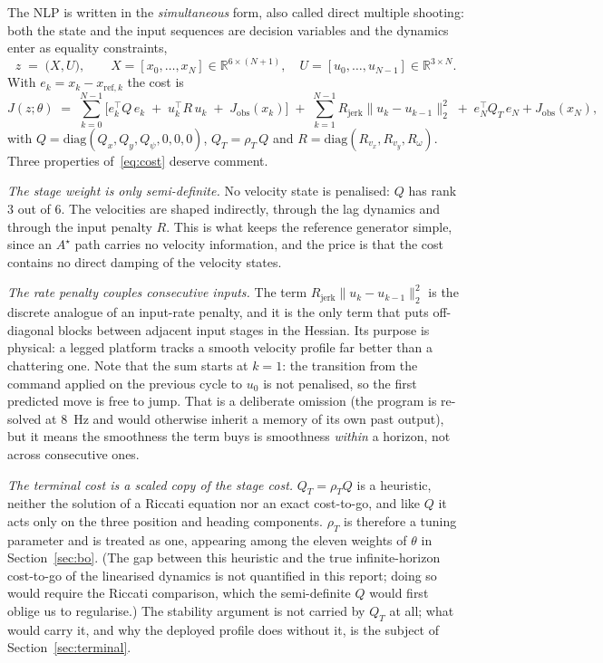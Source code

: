 \documentclass[11pt,a4paper]{article}
\newcommand{\R}{\mathbb{R}}
\newcommand{\astar}{$A^\star$}
\newcommand{\Jobs}{J_{\mathrm{obs}}}
\newcommand{\Rjerk}{R_{\mathrm{jerk}}}
\begin{document}
The NLP is written in the \emph{simultaneous} form, also called direct multiple shooting: both the state and
the input sequences are decision variables and the dynamics enter as equality constraints,
\begin{equation}
  z \;=\; \big(X,U\big),\qquad X=[x_0,\dots,x_N]\in\R^{6\times(N+1)},\quad U=[u_0,\dots,u_{N-1}]\in\R^{3\times N}.
\end{equation}
With $e_k=x_k-x_{\mathrm{ref},k}$ the cost is
\begin{equation}
  J(z;\theta) \;=\;
  \sum_{k=0}^{N-1}\Big[e_k^{\!\top} Q\, e_k
  \;+\; u_k^{\!\top} R\, u_k
  \;+\; \Jobs(x_k)\Big]
  \;+\;\sum_{k=1}^{N-1}\Rjerk\|u_k-u_{k-1}\|_2^2
  \;+\;e_N^{\!\top} Q_T\, e_N + \Jobs(x_N),
  \label{eq:cost}
\end{equation}
with $Q=\mathrm{diag}(Q_x,Q_y,Q_\psi,0,0,0)$, $Q_T=\rho_T\,Q$ and $R=\mathrm{diag}(R_{v_x},R_{v_y},R_\omega)$.
Three properties of~\eqref{eq:cost} deserve comment.

\smallskip\noindent \emph{The stage weight is only semi-definite.} No velocity state is penalised: $Q$ has rank $3$ out of $6$.
The velocities are shaped indirectly, through the lag dynamics and through the input penalty $R$. This is
what keeps the reference generator simple, since an \astar{} path carries no velocity information, and the
price is that the cost contains no direct damping of the velocity states.

\smallskip\noindent \emph{The rate penalty couples consecutive inputs.} The term $\Rjerk\|u_k-u_{k-1}\|_2^2$ is the discrete
analogue of an input-rate penalty, and it is the only term that puts off-diagonal blocks between adjacent
input stages in the Hessian. Its purpose is physical: a legged platform tracks a smooth velocity profile far
better than a chattering one. Note that the sum starts at $k=1$: the transition from the command applied on
the previous cycle to $u_0$ is not penalised, so the first predicted move is free to jump. That is a
deliberate omission (the program is re-solved at $8$~Hz and would otherwise inherit a memory of its own
past output), but it means the smoothness the term buys is smoothness \emph{within} a horizon, not across
consecutive ones.

\smallskip\noindent \emph{The terminal cost is a scaled copy of the stage cost.} $Q_T=\rho_T Q$ is a heuristic, neither the
solution of a Riccati equation nor an exact cost-to-go, and like $Q$ it acts only on the three position and
heading components. $\rho_T$ is therefore a tuning parameter and is treated as one, appearing among the
eleven weights of $\theta$ in Section~\ref{sec:bo}. (The gap between this heuristic and the true
infinite-horizon cost-to-go of the linearised dynamics is not quantified in this report; doing so would
require the Riccati comparison, which the semi-definite $Q$ would first oblige us to regularise.) The
stability argument is not carried by $Q_T$ at all; what would carry it, and why the deployed profile does
without it, is the subject of Section~\ref{sec:terminal}.
\end{document}
